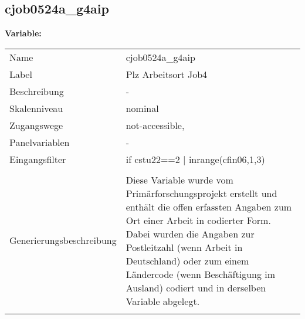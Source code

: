 	
	
	\subsection{cjob0524a\_g4aip}
	\label{subSection:cjob0524a_g4aip}

	\noindent\textbf{Variable:}\\
		\begin{tabular}{lL{11.3cm}}
			\label{tableVariable:cjob0524a_g4aip}
			Name & cjob0524a\_g4aip \\
			Label & Plz Arbeitsort Job4 \\
			Beschreibung & - \\
			Skalenniveau & nominal \\
			Zugangswege &
				not-accessible,
 \\
			Panelvariablen & -
			 \\
			Eingangsfilter & if cstu22==2 | inrange(cfin06,1,3) \\
 \\
					Generierungsbeschreibung & Diese Variable wurde vom Primärforschungsprojekt erstellt und enthält die offen erfassten Angaben zum Ort einer Arbeit in codierter Form. Dabei wurden die Angaben zur Postleitzahl (wenn Arbeit in Deutschland) oder zum einem Ländercode (wenn Beschäftigung im Ausland) codiert und in derselben Variable abgelegt.
				 \\	
			 \\
		\end{tabular}






	
	\newpage
